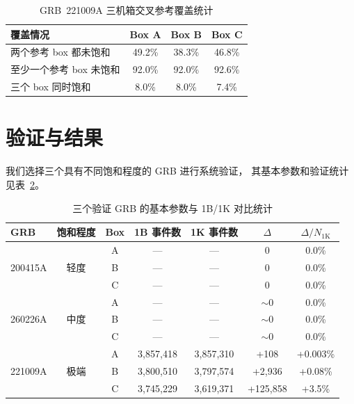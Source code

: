 \documentclass[aps,prd,twocolumn,nofootinbib,superscriptaddress]{revtex4-2}
\begin{document}
\begin{table}[t]
\centering
\caption{GRB~221009A 三机箱交叉参考覆盖统计}
\label{tab:coverage}
\begin{tabular}{lccc}
\toprule
覆盖情况 & Box A & Box B & Box C \\
\midrule
两个参考 box 都未饱和 & 49.2\% & 38.3\% & 46.8\% \\
至少一个参考 box 未饱和 & 92.0\% & 92.0\% & 92.6\% \\
三个 box 同时饱和 & 8.0\% & 8.0\% & 7.4\% \\
\bottomrule
\end{tabular}
\end{table}

\section{验证与结果}\label{sec:results}

我们选择三个具有不同饱和程度的 GRB 进行系统验证，
其基本参数和验证统计见表~\ref{tab:grbs}。

\begin{table}[t]
\centering
\caption{三个验证 GRB 的基本参数与 1B/1K 对比统计}
\label{tab:grbs}
\begin{tabular}{lcccccc}
\toprule
GRB & 饱和程度 & Box & 1B 事件数 & 1K 事件数 & $\Delta$ & $\Delta/N_\mathrm{1K}$ \\
\midrule
\multirow{3}{*}{200415A} & \multirow{3}{*}{轻度} & A & --- & --- & 0 & 0.0\% \\
 & & B & --- & --- & 0 & 0.0\% \\
 & & C & --- & --- & 0 & 0.0\% \\
\midrule
\multirow{3}{*}{260226A} & \multirow{3}{*}{中度} & A & --- & --- & $\sim$0 & 0.0\% \\
 & & B & --- & --- & $\sim$0 & 0.0\% \\
 & & C & --- & --- & $\sim$0 & 0.0\% \\
\midrule
\multirow{3}{*}{221009A} & \multirow{3}{*}{极端} & A & 3,857,418 & 3,857,310 & +108 & +0.003\% \\
 & & B & 3,800,510 & 3,797,574 & +2,936 & +0.08\% \\
 & & C & 3,745,229 & 3,619,371 & +125,858 & +3.5\% \\
\bottomrule
\end{tabular}
\end{table}
\end{document}
